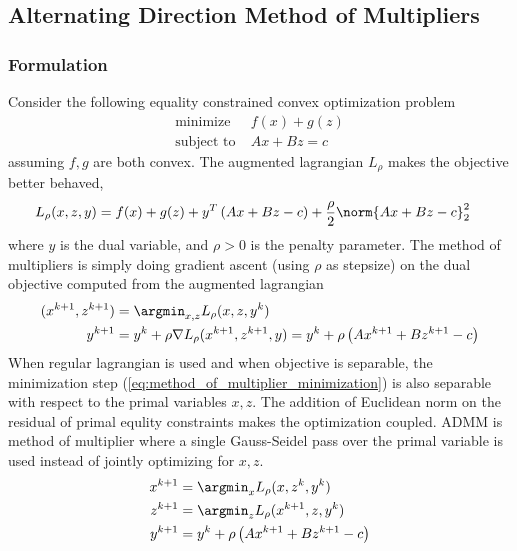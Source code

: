 \documentclass[../writeup.tex]{subfiles}
\begin{document}
\subsection{Alternating Direction Method of Multipliers}

\subsubsection{Formulation}

Consider the following equality constrained convex optimization problem 
\begin{align}
    \text{minimize}\;
        &f(x) + g(z) \\
    \text{subject to}\;
        &Ax+Bz=c
    \label{eq:admm_objective}
\end{align}
assuming $f,g$ are both convex. The augmented lagrangian $L_{\rho}$ makes the objective better behaved,
\begin{align}
    L_{\rho}(x,z,y)
        &= f(x) + g(z) + y^T\left(Ax + Bz - c\right) + \frac{\rho}{2} \norm{Ax+Bz-c}_2^2
\end{align}
where $y$ is the dual variable, and $\rho>0$ is the penalty parameter. The method of multipliers is simply doing gradient ascent (using $\rho$ as stepsize) on the dual objective computed from the augmented lagrangian
\begin{align}
    (x^{k+1},z^{k+1})
        &= \argmin_{x,z} L_{\rho}(x,z,y^{k}) 
        \label{eq:method_of_multiplier_minimization} \\
    y^{k+1}
        &= y^k + \rho \nabla L_{\rho}(x^{k+1},z^{k+1},y)
        = y^k + \rho \left( Ax^{k+1} + Bz^{k+1} - c \right)
        \label{eq:method_of_multiplier_dual_update}
\end{align}
When regular lagrangian is used and when objective is separable, the minimization step (\ref{eq:method_of_multiplier_minimization}) is also separable with respect to the primal variables $x,z$. The addition of Euclidean norm on the residual of primal equlity constraints makes the optimization coupled. ADMM is method of multiplier where a single Gauss-Seidel pass over the primal variable is used instead of jointly optimizing for $x,z$.
\begin{align}
    x^{k+1}
        &= \argmin_{x} L_{\rho}(x,z^k,y^k) 
        \nonumber \\
    z^{k+1}
        &= \argmin_{z} L_{\rho}(x^{k+1},z,y^k) 
        \nonumber \\
    y^{k+1}
        &= y^k + \rho \left( Ax^{k+1} + Bz^{k+1} - c \right)
        \label{eq:admm_iterates_dual_update}
\end{align}
\end{document}
